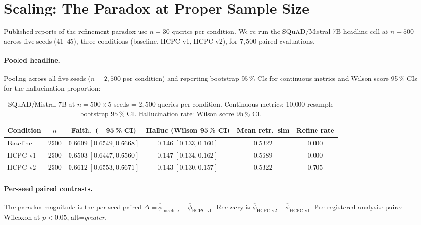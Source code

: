 \section{Scaling: The Paradox at Proper Sample Size}
\label{sec:scaling}

Published reports of the refinement paradox use $n{=}30$ queries
per condition. We re-run the SQuAD/Mistral-7B headline cell at
$n{=}500$ across five seeds (41--45), three conditions (baseline,
HCPC-v1, HCPC-v2), for $7{,}500$ paired evaluations.

\paragraph{Pooled headline.}
Pooling across all five seeds (\(n=2{,}500\) per condition) and
reporting bootstrap 95\,\% CIs for continuous metrics and Wilson
score 95\,\% CIs for the hallucination proportion:

\begin{table}[H]
\centering
\small
\caption{SQuAD/Mistral-7B at $n{=}500{\times}5$ seeds = $2{,}500$
queries per condition. Continuous metrics: 10{,}000-resample
bootstrap 95\,\% CI. Hallucination rate: Wilson score 95\,\% CI.}
\label{tab:scaling-pooled}
\begin{tabular}{lccccc}
\toprule
Condition & $n$ & Faith.\ ($\pm$ 95\,\% CI) &
Halluc (Wilson 95\,\% CI) & Mean retr.\ sim & Refine rate \\
\midrule
Baseline   & 2500 & $0.6609\;[0.6549, 0.6668]$ & $0.146\;[0.133, 0.160]$ & $0.5322$ & $0.000$ \\
HCPC-v1    & 2500 & $0.6503\;[0.6447, 0.6560]$ & $0.147\;[0.134, 0.162]$ & $0.5689$ & $0.000$ \\
HCPC-v2    & 2500 & $0.6612\;[0.6553, 0.6671]$ & $0.143\;[0.130, 0.157]$ & $0.5322$ & $0.705$ \\
\bottomrule
\end{tabular}
\end{table}

\paragraph{Per-seed paired contrasts.}
The paradox magnitude is the per-seed paired
$\Delta = \overline{\phi}_{\text{baseline}} - \overline{\phi}_{\text{HCPC-v1}}$.
Recovery is $\overline{\phi}_{\text{HCPC-v2}} - \overline{\phi}_{\text{HCPC-v1}}$.
Pre-registered analysis: paired Wilcoxon at $p<0.05$, alt=\textit{greater}.

